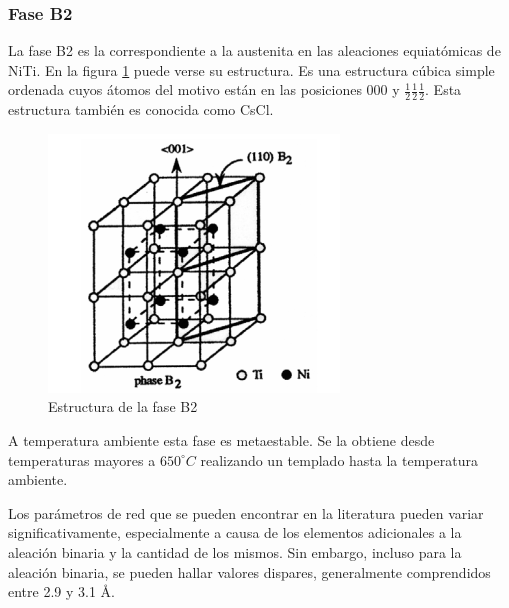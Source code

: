 \documentclass[12pt]{article}
\theoremstyle{definition}
\theoremstyle{remark}
\begin{document}
\subsubsection{Fase B2}
La fase B2 es la correspondiente a la austenita en las aleaciones equiatómicas de NiTi. En la figura \ref{B2phase} puede verse su estructura. Es una estructura cúbica simple ordenada cuyos átomos del motivo están en las posiciones 000 y $\frac{1}{2}\frac{1}{2}\frac{1}{2}$. Esta estructura también es conocida como CsCl.
\begin{figure}[H]
	\centering
	\includegraphics[scale=0.5]{img/B2Phase.png}
	\caption{Estructura de la fase B2}
	\label{B2phase}
\end{figure}

A temperatura ambiente esta fase es metaestable. Se la obtiene desde temperaturas mayores a $650 ^\circ C$ realizando un templado hasta la temperatura ambiente.

Los parámetros de red que se pueden encontrar en la literatura pueden variar significativamente, especialmente a causa de los elementos adicionales a la aleación binaria y la cantidad de los mismos. Sin embargo, incluso para la aleación binaria, se pueden hallar valores dispares, generalmente comprendidos entre 2.9 y 3.1 \AA.
\end{document}
